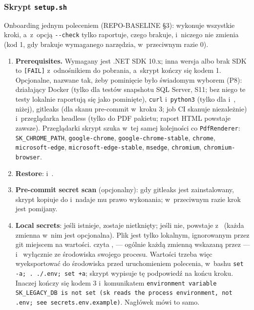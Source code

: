 \subsubsection{Skrypt \texttt{setup.sh}}

Onboarding jednym poleceniem (REPO-BASELINE §3):  wykonuje wszystkie
kroki, a~z~opcją \texttt{-{}-check} tylko raportuje, czego brakuje, i~niczego nie zmienia
(kod 1, gdy brakuje wymaganego narzędzia, w~przeciwnym razie 0).

\begin{enumerate}
  \item \textbf{Prerequisites.} Wymagany jest .NET SDK 10.x; inna wersja albo brak SDK to
        \texttt{[FAIL]} z~odnośnikiem do pobrania, a~skrypt kończy się kodem 1. Opcjonalne,
        nazwane tak, żeby pominięcie było świadomym wyborem (P8): działający Docker (tylko
        dla testów snapshotu SQL Server, S11; bez niego te testy lokalnie raportują się jako
        pominięte), \texttt{curl} i~\texttt{python3} (tylko dla  i~, niżej), gitleaks (dla skanu pre-commit w~kroku 3; job CI skanuje niezależnie) i~przeglądarka headless (tylko do PDF pakietu; raport HTML powstaje zawsze).
        Przeglądarki skrypt szuka w~tej samej kolejności co \texttt{PdfRenderer}:
        \texttt{SK\_CHROME\_PATH}, \texttt{google-chrome}, \texttt{google-chrome-stable},
        \texttt{chrome}, \texttt{microsoft-edge}, \texttt{microsoft-edge-stable},
        \texttt{msedge}, \texttt{chromium}, \texttt{chromium-browser}.
  \item \textbf{Restore}:  i~.
  \item \textbf{Pre-commit secret scan} (opcjonalny): gdy gitleaks jest zainstalowany,
        skrypt kopiuje  do  i~nadaje mu prawo wykonania; w~przeciwnym razie krok jest pomijany.
  \item \textbf{Local secrets}: jeśli  istnieje, zostaje nietknięty; jeśli nie,
        powstaje z~ (każda zmienna w~nim jest opcjonalna).
         Plik
        jest tylko lokalnym, ignorowanym przez git miejscem na wartości.  czyta
        ,  --- ogólnie każdą zmienną
        wskazaną przez  --- i~
        wyłącznie ze środowiska swojego procesu. Wartości trzeba więc wyeksportować do
        środowiska przed uruchomieniem polecenia, w~bashu
        \texttt{set -a; . ./.env; set +a}; skrypt wypisuje tę podpowiedź na końcu kroku.
        Inaczej  kończy się kodem 3 i~komunikatem
        \texttt{environment variable SK\_LEGACY\_DB is not set (sk reads the process
        environment, not .env; see secrets.env.example)}. Nagłówek
         mówi to samo.
\end{enumerate}

